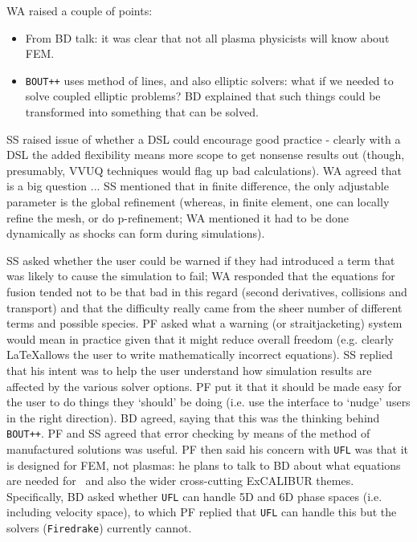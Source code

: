 \documentclass[11pt]{article}
\begin{document}
WA raised a couple of points:

\begin{itemize}
\item From BD talk: it was clear that not all plasma physicists will know about 
FEM.
\item {\tt BOUT++} uses method of lines, and also elliptic solvers: what if we 
needed to solve coupled elliptic problems?  BD explained that such things could 
be transformed into something that can be solved.
\end{itemize}

SS raised issue of whether a DSL could encourage good practice - clearly with a 
DSL the added flexibility means more scope to get nonsense results out (though, 
presumably, VVUQ techniques would flag up bad calculations).  WA agreed that is 
a big question ... SS mentioned that in finite difference, the only adjustable 
parameter is the global refinement (whereas, in finite element, one can locally 
refine the mesh, or do p-refinement; WA mentioned it had to be done dynamically 
as shocks can form during simulations).

SS asked whether the user could be warned if they had introduced a term that 
was likely to cause the simulation to fail; WA responded that the equations for 
fusion tended not to be that bad in this regard (second derivatives, 
collisions and transport) and that the difficulty really came from the sheer 
number of different terms and possible species.  PF asked what a warning (or 
straitjacketing) system would mean in practice given that it might reduce 
overall freedom (e.g. clearly \LaTeX allows the user to write 
mathematically incorrect equations).  SS replied that his intent was to help 
the user understand how simulation results are affected by the various solver 
options.  PF put it that it should be made easy for the user to do things they 
`should' be doing (i.e. use the interface to `nudge' users in the right 
direction).  BD agreed, saying that this was the thinking behind {\tt BOUT++}.  
PF and SS agreed that error checking by means of the method of manufactured 
solutions was useful.  PF then said his concern with {\tt UFL} was that it is 
designed for FEM, not plasmas: he plans to talk to BD about what equations are 
needed for \nep\  and also the wider cross-cutting ExCALIBUR themes.  
Specifically, BD asked whether {\tt UFL} can handle 5D and 6D phase spaces 
(i.e. including velocity space), to which PF replied that {\tt UFL} can handle 
this but the solvers ({\tt Firedrake}) currently cannot.
\end{document}
